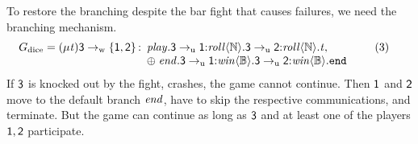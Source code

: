 To restore the branching despite the bar fight that causes failures, we need the \weakR branching mechanism.
\begin{align*}
	\GDiceW = \GRep{\TypeV}{}\GBranW{\Role[3]}{\Set{\Role[1], \Role[2]}}{}
		\begin{array}[t]{l}
			\Label[play].\GComU{\Role[3]}{\Role[1]}{\Label[roll]}{\nat}{\GComU{\Role[3]}{\Role[2]}{\Label[roll]}{\nat}{\TypeV}},\\
			\oplus \; \Label[end].\GComU{\Role[3]}{\Role[1]}{\Label[win]}{\bool}{\GComU{\Role[3]}{\Role[2]}{\Label[win]}{\bool}{\GEnd}}
		\end{array} & \tag{3}\label{eq:diceGW}
\end{align*}
If $ \Role[3] $ is knocked out by the fight, \ie crashes, the game cannot continue.
Then $ \Role[1] $ and $ \Role[2] $ move to the default branch $ \Label[end] $, have to skip the respective \unrel communications, and terminate.
But the game can continue as long as $ \Role[3] $ and at least one of the players $ \Role[1], \Role[2] $ participate.

